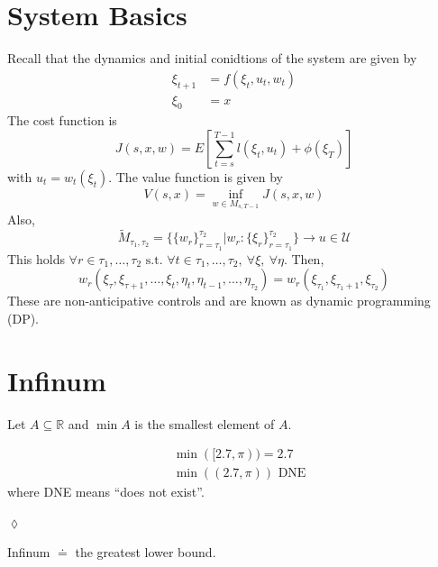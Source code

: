 % 
% 
%
%
% 
\mainmatter
\setcounter{page}{1}

\lectureseries[\course]{\course}

\date{October 8, 2009}

\setaddress

\setcounter{lecture}{3}
\setcounter{chapter}{3}


\section{System Basics}
Recall that the dynamics and initial conidtions of the system are given by
\begin{align*}
\xi_{t+1} &= f(\xi_t,u_t,w_t) \\
\xi_0 &= x
\end{align*}
The cost function is
$$J(s,x,w) = E\left[\sum_{t=s}^{T-1}l(\xi_t,u_t) + \phi(\xi_T)\right]$$
with $u_t=w_t(\xi_t)$. The value function is given by
$$V(s,x) = \inf_{w\in M_{s,T-1}} J(s,x,w)$$
Also,
$$\tilde{M}_{\tau_1,\tau_2} = \{\{w_r\}_{r=\tau_1}^{\tau_2} | w_r:\{\xi_r\}_{r=\tau_1}^{\tau_2}\} \to u\in\mathcal{U}$$
This holds $\forall r\in\tau_1,\ldots,\tau_2 \text{ s.t. } \forall t\in\tau_1,\ldots,\tau_2, ~\forall \xi, ~\forall \eta$. Then,
$$w_r(\xi_\tau,\xi_{\tau+1},\ldots,\xi_t,\eta_t,\eta_{t-1},\ldots,\eta_{\tau_2}) = w_r(\xi_{\tau_1},\xi_{\tau_1+1},\xi_{\tau_2})$$
These are non-anticipative controls and are known as dynamic programming (DP).

\section{Infinum}
Let $A\subseteq\mathbb{R}$ and $\min A$ is the smallest element of $A$.

\begin{example}
\begin{align*}
&\min([2.7,\pi)) = 2.7 \\
&\min((2.7,\pi)) \text{ DNE}
\end{align*}
where DNE means ``does not exist''.
\end{example}
$\lozenge$

\begin{definition}
Infinum $\doteq$ the greatest lower bound.
\end{definition}

